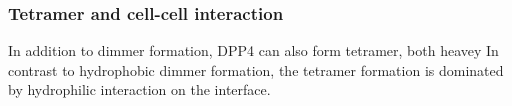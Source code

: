 \subsubsection{Tetramer and cell-cell interaction}

In addition to dimmer formation, DPP4 can also form tetramer, both heavey In contrast to hydrophobic dimmer formation, the tetramer formation is dominated by hydrophilic interaction on the interface.~\cite{Engel_2003} 